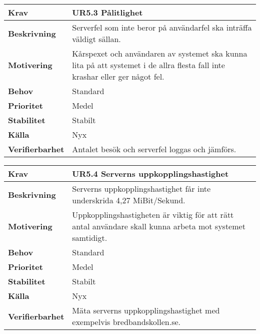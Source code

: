 \documentclass[a4paper, twoside, 11pt, titlepage]{article}
\begin{document}
		\begin {table} [ht] \begin{tabular} { p{2.6cm} p{12.5cm} }
			\hline
			{\sffamily\textbf{Krav}} & {\sffamily\textbf{UR5.3 Pålitlighet}} \\
			\hline
			{\sffamily\textbf{Beskrivning}} & {Serverfel som inte beror på användarfel ska inträffa väldigt sällan.} \\
			\hline
			{\sffamily\textbf{Motivering}} & {Kårspexet och användaren av systemet ska kunna lita på att systemet i de allra flesta fall inte krashar eller ger något fel.} \\
			\hline
			{\sffamily\textbf{Behov}} & {Standard} \\
			\hline
			{\sffamily\textbf{Prioritet}} & {Medel} \\
			\hline
			{\sffamily\textbf{Stabilitet}} & {Stabilt} \\
			\hline
			{\sffamily\textbf{Källa}} & {Nyx} \\
			\hline
			{\sffamily\textbf{Verifierbarhet}} & {Antalet besök och serverfel loggas och jämförs.} \\
			\hline
		\end{tabular} \end{table} \FloatBarrier
		\vspace{6mm}

		\begin {table} [ht] \begin{tabular} { p{2.6cm} p{12.5cm} }
			\hline
			{\sffamily\textbf{Krav}} & {\sffamily\textbf{UR5.4 Serverns uppkopplingshastighet}} \\
			\hline
			{\sffamily\textbf{Beskrivning}} & {Serverns uppkopplingshastighet får inte underskrida 4,27 MiBit/Sekund.} \\
			\hline
			{\sffamily\textbf{Motivering}} & {Uppkopplingshastigheten är viktig för att rätt antal användare skall kunna arbeta mot systemet samtidigt.} \\
			\hline
			{\sffamily\textbf{Behov}} & {Standard} \\
			\hline
			{\sffamily\textbf{Prioritet}} & {Medel} \\
			\hline
			{\sffamily\textbf{Stabilitet}} & {Stabilt} \\
			\hline
			{\sffamily\textbf{Källa}} & {Nyx} \\
			\hline
			{\sffamily\textbf{Verifierbarhet}} & {Mäta serverns uppkopplingshastighet med exempelvis bredbandskollen.se.} \\
			\hline
		\end{tabular} \end{table} \FloatBarrier
\end{document}
